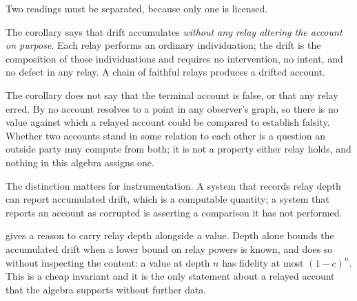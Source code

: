 \begin{remark}
\label{rem:relay-scope}
Two readings must be separated, because only one is licensed.

The corollary says that drift accumulates \emph{without any relay altering
the account on purpose}. Each relay performs an ordinary individuation; the
drift is the composition of those individuations and requires no
intervention, no intent, and no defect in any relay. A chain of faithful
relays produces a drifted account.

The corollary does not say that the terminal account is false, or that any
relay erred. By  no account resolves to a point in any
observer's graph, so there is no value against which a relayed account could
be compared to establish falsity. Whether two accounts stand in some
relation to each other is a question an outside party may compute from both;
it is not a property either relay holds, and nothing in this algebra assigns
one.

The distinction matters for instrumentation. A system that records relay
depth can report accumulated drift, which is a computable quantity; a system
that reports an account as corrupted is asserting a comparison it has not
performed.
\end{remark}

\begin{remark}
\label{rem:relay-depth}
 gives a reason to carry relay depth alongside a
value. Depth alone bounds the accumulated drift when a lower bound on relay
powers is known, and does so without inspecting the content: a value at
depth $n$ has fidelity at most $(1-c)^{n}$. This is a cheap invariant and it
is the only statement about a relayed account that the algebra supports
without further data.
\end{remark}
